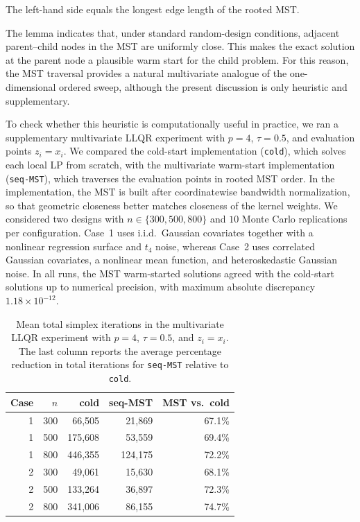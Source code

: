 \documentclass[lineno]{biometrika}
\newcommand{\simtableformat}{%
  \footnotesize
  \setlength{\tabcolsep}{3.5pt}%
  \renewcommand{\arraystretch}{0.95}%
}
\begin{document}
The left-hand side equals the longest edge length of the rooted MST.

The lemma indicates that, under standard random-design conditions, adjacent parent--child nodes in the MST are
uniformly close. This makes the exact solution at the parent node a plausible warm start for the child problem. For
this reason, the MST traversal provides a natural multivariate analogue of the one-dimensional ordered sweep, although
the present discussion is only heuristic and supplementary.

To check whether this heuristic is computationally useful in practice, we ran a supplementary multivariate LLQR
experiment with $p=4$, $\tau=0.5$, and evaluation points $z_i=x_i$. We compared the cold-start implementation
(\texttt{cold}), which solves each local LP from scratch, with the multivariate warm-start implementation
(\texttt{seq-MST}), which traverses the evaluation points in rooted MST order. In the implementation, the MST is
built after coordinatewise bandwidth normalization, so that geometric closeness better matches closeness of the kernel
weights. We considered two designs with $n\in\{300,500,800\}$ and $10$ Monte Carlo replications per configuration.
Case~1 uses i.i.d.\ Gaussian covariates together with a nonlinear regression surface and $t_4$ noise, whereas Case~2
uses correlated Gaussian covariates, a nonlinear mean function, and heteroskedastic Gaussian noise. In all runs, the
MST warm-started solutions agreed with the cold-start solutions up to numerical precision, with maximum absolute
discrepancy $1.18\times 10^{-12}$.

\begin{table}[htbp]
\centering
\caption{Mean total simplex iterations in the multivariate LLQR experiment with $p=4$, $\tau=0.5$, and $z_i=x_i$.
The last column reports the average percentage reduction in total iterations for \texttt{seq-MST} relative to
\texttt{cold}.}
\begingroup
\simtableformat
\begin{tabular}{rrrrr}
\toprule
Case & $n$ & cold & seq-MST & MST vs.\ cold \\
\midrule
1 & 300 & 66,505 & 21,869 & 67.1\% \\
1 & 500 & 175,608 & 53,559 & 69.4\% \\
1 & 800 & 446,355 & 124,175 & 72.2\% \\
2 & 300 & 49,061 & 15,630 & 68.1\% \\
2 & 500 & 133,264 & 36,897 & 72.3\% \\
2 & 800 & 341,006 & 86,155 & 74.7\% \\
\bottomrule
\end{tabular}
\endgroup
\label{tab:mst_multivar_iterations}
\end{table}
\end{document}
